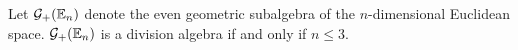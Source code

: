 \begin{lemma}\label{l:nondivisibility}
	Let $\mathcal{G}_+(\mathbb{E}_n)$ denote the even geometric subalgebra of the $n$-dimensional Euclidean space.
	$\mathcal{G}_+(\mathbb{E}_n)$ is a division algebra if and only if $n \leq 3$.
\end{lemma}
